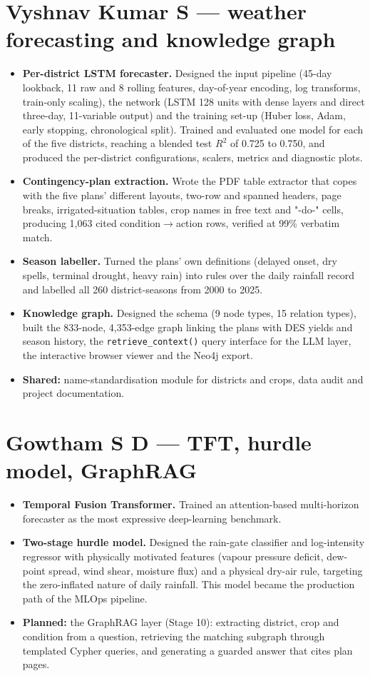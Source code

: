 \section{Vyshnav Kumar S --- weather forecasting and knowledge graph}
\begin{itemize}
	\item \textbf{Per-district LSTM forecaster.} Designed the input pipeline (45-day lookback, 11 raw and 8 rolling features, day-of-year encoding, log transforms, train-only scaling), the network (LSTM 128 units with dense layers and direct three-day, 11-variable output) and the training set-up (Huber loss, Adam, early stopping, chronological split). Trained and evaluated one model for each of the five districts, reaching a blended test $R^2$ of 0.725 to 0.750, and produced the per-district configurations, scalers, metrics and diagnostic plots.
	\item \textbf{Contingency-plan extraction.} Wrote the PDF table extractor that copes with the five plans' different layouts, two-row and spanned headers, page breaks, irrigated-situation tables, crop names in free text and "-do-" cells, producing 1,063 cited condition$\to$action rows, verified at 99\% verbatim match.
	\item \textbf{Season labeller.} Turned the plans' own definitions (delayed onset, dry spells, terminal drought, heavy rain) into rules over the daily rainfall record and labelled all 260 district-seasons from 2000 to 2025.
	\item \textbf{Knowledge graph.} Designed the schema (9 node types, 15 relation types), built the 833-node, 4,353-edge graph linking the plans with DES yields and season history, the \texttt{retrieve\_context()} query interface for the LLM layer, the interactive browser viewer and the Neo4j export.
	\item \textbf{Shared:} name-standardisation module for districts and crops, data audit and project documentation.
\end{itemize}

\section{Gowtham S D --- TFT, hurdle model, GraphRAG}
\begin{itemize}
	\item \textbf{Temporal Fusion Transformer.} Trained an attention-based multi-horizon forecaster as the most expressive deep-learning benchmark.
	\item \textbf{Two-stage hurdle model.} Designed the rain-gate classifier and log-intensity regressor with physically motivated features (vapour pressure deficit, dew-point spread, wind shear, moisture flux) and a physical dry-air rule, targeting the zero-inflated nature of daily rainfall. This model became the production path of the MLOps pipeline.
	\item \textbf{Planned:} the GraphRAG layer (Stage 10): extracting district, crop and condition from a question, retrieving the matching subgraph through templated Cypher queries, and generating a guarded answer that cites plan pages.
\end{itemize}

